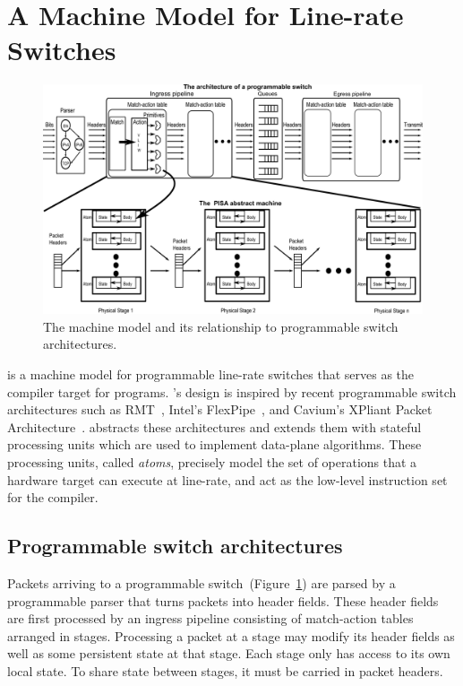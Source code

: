 \section{A Machine Model for Line-rate Switches}
\label{s:absmachine}

\begin{figure}[!t]
  \includegraphics[width=\textwidth]{pisa.pdf}
  \caption{The \absmachine machine model and its relationship to
  programmable switch architectures.}
  \label{fig:switch}
\end{figure}

\absmachine is a machine model for programmable line-rate switches
that serves as the compiler target for \pktlanguage programs.  \absmachine's
design is inspired by recent programmable switch architectures such as
RMT~\cite{rmt}, Intel's FlexPipe~\cite{flexpipe}, and Cavium's XPliant Packet
Architecture~\cite{xpliant}. \absmachine abstracts these architectures and
extends them with stateful processing units which are used to implement
data-plane algorithms. These processing units, called {\em atoms}, precisely
model the set of operations that a hardware target can execute at line-rate,
and act as the low-level instruction set for the \pktlanguage compiler.

\subsection{Programmable switch architectures}
Packets arriving to a programmable switch~(Figure~\ref{fig:switch})
are parsed by a programmable parser that turns packets into header
fields. These header fields are first processed by an ingress pipeline
consisting of match-action tables arranged in stages. Processing a
packet at a stage may modify its header fields as well as some
persistent state at that stage. Each stage only has access to its
own local state. To share state between stages, it must be carried in
packet headers.

